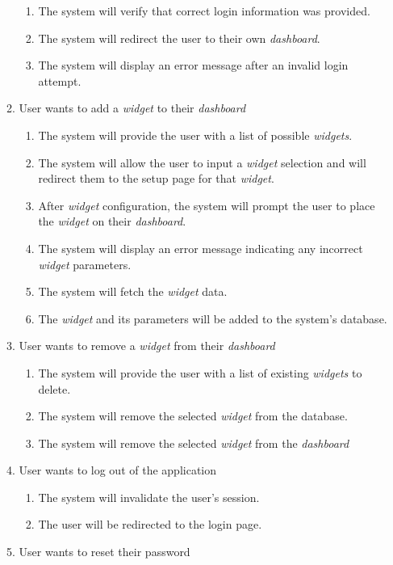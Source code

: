 \documentclass{article}
\begin{document}
\begin{enumerate}[{VP}1]
\begin{enumerate}[{BE}1]
\begin{enumerate}
			\item The system will verify that correct login information was provided.
			\item The system will redirect the user to their own \textit{dashboard}. 
			\item The system will display an error message after an invalid login attempt.
	    \end{enumerate}
	    \item User wants to add a \textit{widget} to their \textit{dashboard}
		\begin{enumerate}
			\item The system will provide the user with a list of possible \textit{widgets}. 
			\item The system will allow the user to input a \textit{widget} selection and will redirect them to the setup page for that \textit{widget}.
			\item After \textit{widget} configuration, the system will prompt the user to place the \textit{widget} on their \textit{dashboard}.
			\item The system will display an error message indicating any incorrect \textit{widget} parameters.
			\item The system will fetch the \textit{widget} data.
			\item The \textit{widget} and its parameters will be added to the system's database.
		\end{enumerate}
		\item User wants to remove a \textit{widget} from their \textit{dashboard}
		\begin{enumerate}
			\item The system will provide the user with a list of existing \textit{widgets} to delete. 
			\item The system will remove the selected \textit{widget} from the database.
			\item The system will remove the selected \textit{widget} from the \textit{dashboard}
		\end{enumerate}
		\item User wants to log out of the application
		\begin{enumerate}
			\item The system will invalidate the user's session.
			\item The user will be redirected to the login page.
		\end{enumerate}
		\item User wants to reset their password

\end{enumerate}
\end{enumerate}
\end{document}
